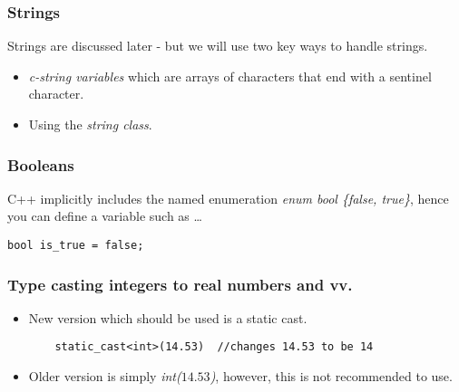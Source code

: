 

\subsubsection*{Strings}
Strings are discussed later - but we will use two key ways to handle strings.
\begin{itemize}
	\item \emph{c-string variables} which are arrays of characters that end with a sentinel character.
	\item Using the \emph{string class}.
\end{itemize}

\subsubsection*{Booleans}
C++ implicitly includes the named enumeration \emph{enum bool \{false, true\}}, hence
you can define a variable such as \ldots
\begin{verbatim}
bool is_true = false;
\end{verbatim}

\subsubsection*{Type casting integers to real numbers and vv.}
\begin{itemize}
	\item New version which should be used is a static cast.
	\begin{verbatim}
	static_cast<int>(14.53)  //changes 14.53 to be 14
	\end{verbatim}
	\item Older version is simply \emph{int($14.53$)}, however, this is not recommended to use.
\end{itemize}

